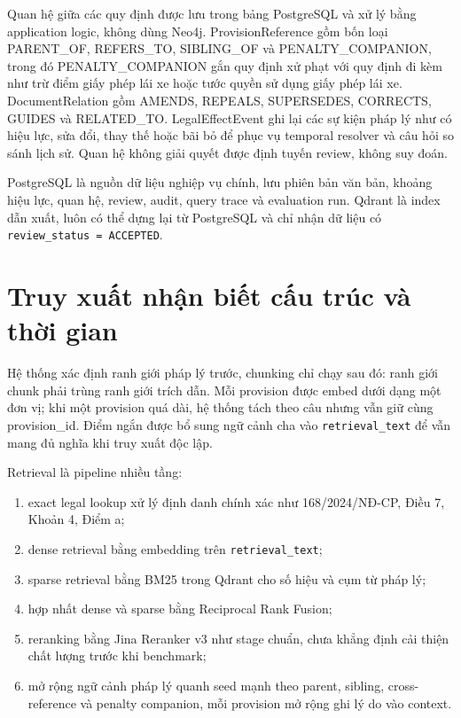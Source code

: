 \documentclass[12pt,a4paper]{article}
\begin{document}
Quan hệ giữa các quy định được lưu trong bảng PostgreSQL và xử lý bằng application logic, không dùng Neo4j. ProvisionReference gồm bốn loại PARENT\_OF, REFERS\_TO, SIBLING\_OF và PENALTY\_COMPANION, trong đó PENALTY\_COMPANION gắn quy định xử phạt với quy định đi kèm như trừ điểm giấy phép lái xe hoặc tước quyền sử dụng giấy phép lái xe. DocumentRelation gồm AMENDS, REPEALS, SUPERSEDES, CORRECTS, GUIDES và RELATED\_TO. LegalEffectEvent ghi lại các sự kiện pháp lý như có hiệu lực, sửa đổi, thay thế hoặc bãi bỏ để phục vụ temporal resolver và câu hỏi so sánh lịch sử. Quan hệ không giải quyết được định tuyến review, không suy đoán.

PostgreSQL là nguồn dữ liệu nghiệp vụ chính, lưu phiên bản văn bản, khoảng hiệu lực, quan hệ, review, audit, query trace và evaluation run. Qdrant là index dẫn xuất, luôn có thể dựng lại từ PostgreSQL và chỉ nhận dữ liệu có \texttt{review\_status = ACCEPTED}.

\section{Truy xuất nhận biết cấu trúc và thời gian}

Hệ thống xác định ranh giới pháp lý trước, chunking chỉ chạy sau đó: ranh giới chunk phải trùng ranh giới trích dẫn. Mỗi provision được embed dưới dạng một đơn vị; khi một provision quá dài, hệ thống tách theo câu nhưng vẫn giữ cùng provision\_id. Điểm ngắn được bổ sung ngữ cảnh cha vào \texttt{retrieval\_text} để vẫn mang đủ nghĩa khi truy xuất độc lập.

Retrieval là pipeline nhiều tầng:

\begin{enumerate}
  \item exact legal lookup xử lý định danh chính xác như 168/2024/NĐ-CP, Điều 7, Khoản 4, Điểm a;
  \item dense retrieval bằng embedding trên \texttt{retrieval\_text};
  \item sparse retrieval bằng BM25 trong Qdrant cho số hiệu và cụm từ pháp lý;
  \item hợp nhất dense và sparse bằng Reciprocal Rank Fusion;
  \item reranking bằng Jina Reranker v3 như stage chuẩn, chưa khẳng định cải thiện chất lượng trước khi benchmark;
  \item mở rộng ngữ cảnh pháp lý quanh seed mạnh theo parent, sibling, cross-reference và penalty companion, mỗi provision mở rộng ghi lý do vào context.
\end{enumerate}
\end{document}
